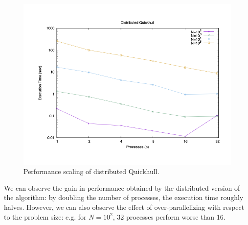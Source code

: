 \documentclass[]{finalproject}
\begin{document}
\begin{figure}[H]
    \centering
    \includegraphics[width=0.7\linewidth]{gpStrongTime.png}
    \caption{Performance scaling of distributed Quickhull.}
    \label{fig:qh-scaling}
\end{figure}

We can observe the gain in performance obtained by the distributed version of the algorithm:
by doubling the number of processes, the execution time roughly halves.
However, we can also observe the effect of over-parallelizing with respect to the problem size:
e.g. for $N=10^2$, 32 processes perform worse than 16.

\clearpage


\end{document}

